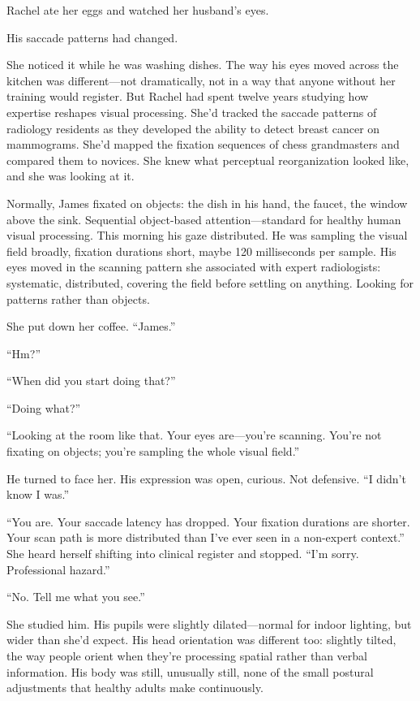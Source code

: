 Rachel ate her eggs and watched her husband's eyes.

\bigskip

His saccade patterns had changed.

She noticed it while he was washing dishes. The way his eyes moved across the kitchen was different---not dramatically, not in a way that anyone without her training would register. But Rachel had spent twelve years studying how expertise reshapes visual processing. She'd tracked the saccade patterns of radiology residents as they developed the ability to detect breast cancer on mammograms. She'd mapped the fixation sequences of chess grandmasters and compared them to novices. She knew what perceptual reorganization looked like, and she was looking at it.

Normally, James fixated on objects: the dish in his hand, the faucet, the window above the sink. Sequential object-based attention---standard for healthy human visual processing. This morning his gaze distributed. He was sampling the visual field broadly, fixation durations short, maybe 120 milliseconds per sample. His eyes moved in the scanning pattern she associated with expert radiologists: systematic, distributed, covering the field before settling on anything. Looking for patterns rather than objects.

She put down her coffee. ``James.''

``Hm?''

``When did you start doing that?''

``Doing what?''

``Looking at the room like that. Your eyes are---you're scanning. You're not fixating on objects; you're sampling the whole visual field.''

He turned to face her. His expression was open, curious. Not defensive. ``I didn't know I was.''

``You are. Your saccade latency has dropped. Your fixation durations are shorter. Your scan path is more distributed than I've ever seen in a non-expert context.'' She heard herself shifting into clinical register and stopped. ``I'm sorry. Professional hazard.''

``No. Tell me what you see.''

She studied him. His pupils were slightly dilated---normal for indoor lighting, but wider than she'd expect. His head orientation was different too: slightly tilted, the way people orient when they're processing spatial rather than verbal information. His body was still, unusually still, none of the small postural adjustments that healthy adults make continuously.

